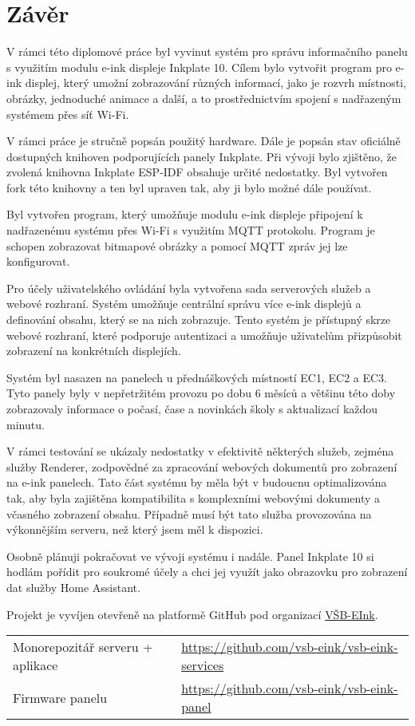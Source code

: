 \chapter{Závěr}

V rámci této diplomové práce byl vyvinut systém pro správu informačního panelu s využitím modulu e-ink displeje Inkplate 10. Cílem bylo vytvořit program pro e-ink displej, který umožní zobrazování různých informací, jako je rozvrh místnosti, obrázky, jednoduché animace a další, a to prostřednictvím spojení s nadřazeným systémem přes síť Wi-Fi.

V rámci práce je stručně popsán použitý hardware. Dále je popsán stav oficiálně dostupných knihoven podporujících panely Inkplate. Při vývoji bylo zjištěno, že zvolená knihovna Inkplate ESP-IDF obsahuje určité nedostatky. Byl vytvořen fork této knihovny a ten byl upraven tak, aby ji bylo možné dále používat.

Byl vytvořen program, který umožňuje modulu e-ink displeje připojení k nadřazenému systému přes Wi-Fi s využitím MQTT protokolu. Program je schopen zobrazovat bitmapové obrázky a pomocí MQTT zpráv jej lze konfigurovat.

Pro účely uživatelského ovládání byla vytvořena sada serverových služeb a webové rozhraní. Systém umožňuje centrální správu více e-ink displejů a definování obsahu, který se na nich zobrazuje. Tento systém je přístupný skrze webové rozhraní, které podporuje autentizaci a umožňuje uživatelům přizpůsobit zobrazení na konkrétních displejích.

Systém byl nasazen na panelech u přednáškových místností EC1, EC2 a EC3. Tyto panely byly v nepřetržitém provozu po dobu 6 měsíců a většinu této doby zobrazovaly informace o počasí, čase a novinkách školy s aktualizací každou minutu.

V rámci testování se ukázaly nedostatky v efektivitě některých služeb, zejména služby Renderer, zodpovědné za zpracování webových dokumentů pro zobrazení na e-ink panelech. Tato část systému by měla být v budoucnu optimalizována tak, aby byla zajištěna kompatibilita s komplexními webovými dokumenty a včasného zobrazení obsahu. Případně musí být tato služba provozována na výkonnějším serveru, než který jsem měl k dispozici.

Osobně plánuji pokračovat ve vývoji systému i nadále. Panel Inkplate 10 si hodlám pořídit pro soukromé účely a chci jej využít jako obrazovku pro zobrazení dat služby Home Assistant\cite{HomeassistantCoreHouse_with_garden}.

\newpage
Projekt je vyvíjen otevřeně na platformě GitHub pod organizací \href{https://github.com/vsb-eink/}{VŠB-EInk}.
\begin{table}[h]
    \begin{tabular}{ll}
        Monorepozitář serveru + aplikace & \url{https://github.com/vsb-eink/vsb-eink-services} \\
        Firmware panelu & \url{https://github.com/vsb-eink/vsb-eink-panel} \\
    \end{tabular}
\end{table}